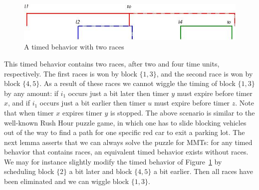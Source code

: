 \iflong
\begin{figure}
\vspace{-2em}
\begin{center}
\includegraphics[width=.45\textwidth]{wiggling.jpg}
\end{center}
\caption{A timed behavior with two races}
\label{fig:races}
\end{figure}
\fi
This timed behavior contains two races, after two and four time units, respectively.
The first races is won by block $\{ 1, 3 \}$, and the second race is won by block $\{ 4, 5 \}$.
As a result of these races we cannot wiggle the timing of block $\{ 1, 3 \}$ by any amount:
if $i_1$ occurs just a bit later then timer $y$ must expire before timer $x$,
and if $i_1$ occurs just a bit earlier then timer $u$ must expire before timer $z$.
Note that when timer $x$ expires timer $y$ is stopped.
%
The above scenario is similar to the well-known Rush Hour puzzle game,
in which one has to slide blocking vehicles out of the way to find a path for one specific red car to exit a parking lot.
The next lemma asserts that we can always solve the puzzle for MMTs: for any timed behavior that contains races,
an equivalent timed behavior exists without races.
We may for instance slightly modify the timed behavior
\iflong
of Figure~\ref{fig:races} 
\fi
by scheduling block $\{ 2  \}$
a bit later and block $\{ 4, 5 \}$ a bit earlier.
Then all races have been eliminated and we can wiggle block $\{ 1, 3 \}$.


